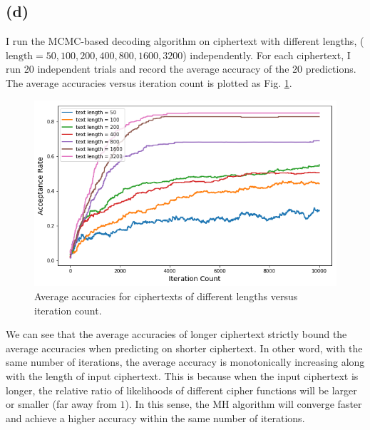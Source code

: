 \documentclass[12pt,aps,pre,reprint]{revtex4-1}
\begin{document}
\subsection{(d)}
I run the MCMC-based decoding algorithm on ciphertext with different lengths, ($\text{length}=50, 100, 200, 400, 800, 1600, 3200$) independently. For each ciphertext, I run 20 independent trials and record the average accuracy of the 20 predictions. The average accuracies versus iteration count is plotted as Fig. \ref{fig:text-length}.
\begin{figure}[H]
	\centering
	\includegraphics[width=\linewidth]{pics/text-length.png}
	\caption{Average accuracies for ciphertexts of different lengths versus iteration count.}
	\label{fig:text-length}
\end{figure}
We can see that the average accuracies of longer ciphertext strictly bound the average accuracies when predicting on shorter ciphertext. In other word, with the same number of iterations, the average accuracy is monotonically increasing along with the length of input ciphertext. This is because when the input ciphertext is longer, the relative ratio of likelihoods of different cipher functions will be larger or smaller (far away from $1$). In this sense, the MH algorithm will converge faster and achieve a higher accuracy within the same number of iterations.
\end{document}

